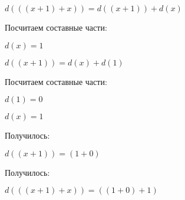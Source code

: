 $ d(((x+1)+x)) = d((x+1)) + d(x)$

Посчитаем составные части:

$ d(x) = 1$

$ d((x+1)) = d(x) + d(1)$

Посчитаем составные части:

$ d(1) = 0$

$ d(x) = 1$

Получилось:

$ d((x+1)) = (1+0)$

Получилось:

$ d(((x+1)+x)) = ((1+0)+1)$


